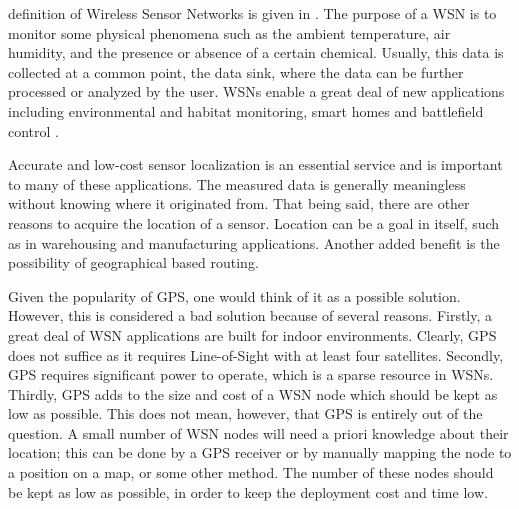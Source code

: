 
% 

 definition of Wireless Sensor Networks is given in \cite{akyildiz2002wsn}. The purpose of a WSN is to monitor some physical phenomena such as the ambient temperature, air humidity, and the presence or absence of a certain chemical. Usually, this data is collected at a common point, the data sink, where the data can be further processed or analyzed by the user. WSNs enable a great deal of new applications including environmental and habitat monitoring, smart homes and battlefield control \cite{tolle2005mr} \cite{chong2003sne}.

Accurate and low-cost sensor localization is an essential service and is important to many of these applications. The measured data is generally meaningless without knowing where it originated from. That being said, there are other reasons to acquire the location of a sensor. Location can be a goal in itself, such as in warehousing and manufacturing applications. Another added benefit is the possibility of geographical based routing. 

Given the popularity of GPS, one would think of it as a possible solution. However, this is considered a bad solution because of several reasons. Firstly, a great deal of WSN applications are built  for indoor environments. Clearly, GPS does not suffice as it requires Line-of-Sight with at least four satellites. Secondly, GPS requires significant power to operate, which is a sparse resource in WSNs. Thirdly, GPS adds to the size and cost of a WSN node which should be kept as low as possible. This does not mean, however, that GPS is entirely out of the question. A small number of WSN nodes will need a priori knowledge about their location; this can be done by a GPS receiver or by manually mapping the node to a position on a map, or some other method. The number of these nodes should be kept as low as possible, in order to keep the deployment cost and time low. 

